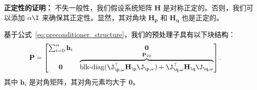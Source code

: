 

\textbf{正定性的证明：}
\label{sec: invert}
不失一般性，我们假设系统矩阵 $\mathbf{H}$ 是对称正定的。否则，我们可以添加 $\alpha \I$ 来确保其正定性。显然，其对角块 $\mathbf{H}_{\mathbf{p}}$ 和 $\mathbf{H}_{\mathbf{q}}$ 也是正定的。

\textcolor{black}{基于公式~\ref{eq:preconditioner_structure}，我们的预处理子具有以下块结构：
\begin{equation}
  \begin{aligned}
    \mathbf{P} & =\begin{bmatrix}
                    \sum_{i=0}^{n}\mathbf{h}_{i} & \mathbf{0}                                                                                                                                                \\
                    \mathbf{0}                   & \overbrace{\operatorname{blk-diag}(\J_{\p,\omega}^\top \mathbf{H}_\p \J_{\p,\omega})+ \J_{\q,\omega}^\top \mathbf{H}_\q \J_{\q,\omega}}^{\mathbf{P}_{22}}
                  \end{bmatrix}.
  \end{aligned}
\end{equation}
}
其中 $\mathbf{h}_{i}$ 是对角矩阵，其对角元素均大于 $\mathbf{0}$。

